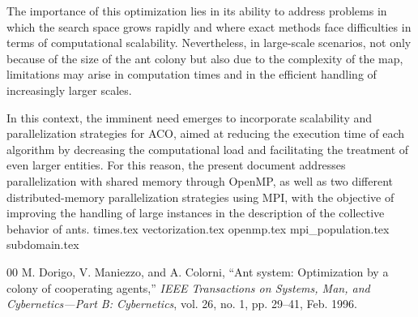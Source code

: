 \documentclass[conference]{IEEEtran}
\begin{document}
The importance of this optimization lies in its ability to address problems in which the search space grows rapidly and where exact methods face difficulties in terms of computational scalability. Nevertheless, in large-scale scenarios, not only because of the size of the ant colony but also due to the complexity of the map, limitations may arise in computation times and in the efficient handling of increasingly larger scales.

In this context, the imminent need emerges to incorporate scalability and parallelization strategies for ACO, aimed at reducing the execution time of each algorithm by decreasing the computational load and facilitating the treatment of even larger entities. For this reason, the present document addresses parallelization with shared memory through OpenMP, as well as two different distributed-memory parallelization strategies using MPI, with the objective of improving the handling of large instances in the description of the collective behavior of ants.
{times.tex}
{vectorization.tex}
{openmp.tex}
{mpi_population.tex}
{subdomain.tex}

\begin{thebibliography}{00}
 M. Dorigo, V. Maniezzo, and A. Colorni, ``Ant system: Optimization by a colony of cooperating agents,'' \textit{IEEE Transactions on Systems, Man, and Cybernetics---Part B: Cybernetics}, vol. 26, no. 1, pp. 29--41, Feb. 1996.
\end{thebibliography}
\end{document}
